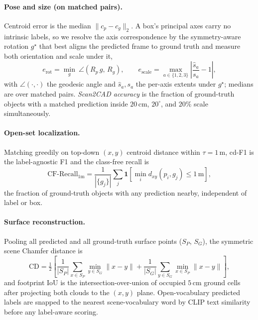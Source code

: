 \documentclass[conference]{IEEEtran}
\begin{document}
\paragraph{Pose and size (on matched pairs).}
Centroid error is the median $\lVert c_p-c_g\rVert_2$. A box's principal axes
carry no intrinsic labels, so we resolve the axis correspondence by the
symmetry-aware rotation $g^\star$ that best aligns the predicted frame to ground
truth and measure both orientation and scale under it,
\begin{equation}
  e_{\text{rot}}=\min_{g}\ \angle\!\left(R_p\,g,\,R_g\right),\qquad
  e_{\text{scale}}=\max_{a\in\{1,2,3\}}\left|\frac{\hat{s}_a}{s_a}-1\right| ,
\end{equation}
with $\angle(\cdot,\cdot)$ the geodesic angle and $\hat{s}_a,s_a$ the per-axis
extents under $g^\star$; medians are over matched pairs. \emph{Scan2CAD
accuracy} is the fraction of ground-truth objects with a matched prediction
inside $20\,\text{cm}$, $20^\circ$, and $20\%$ scale simultaneously.

\paragraph{Open-set localization.}
Matching greedily on top-down $(x,y)$ centroid distance within
$\tau=1\,\text{m}$, cd-F1 is the label-agnostic F1 and the class-free recall is
\begin{equation}
  \text{CF-Recall}_{1\text{m}}=\frac{1}{|\{g_j\}|}\sum_j
  \mathbf{1}\!\left[\min_i d_{xy}(p_i,g_j)\le 1\,\text{m}\right],
\end{equation}
the fraction of ground-truth objects with any prediction nearby, independent of
label or box.

\paragraph{Surface reconstruction.}
Pooling all predicted and all ground-truth surface points ($S_P$, $S_G$), the
symmetric scene Chamfer distance is
\begin{equation}
  \text{CD}=\tfrac{1}{2}\!\left[\frac{1}{|S_P|}\!\sum_{x\in S_P}\!\min_{y\in S_G}\!\lVert x-y\rVert
  +\frac{1}{|S_G|}\!\sum_{y\in S_G}\!\min_{x\in S_P}\!\lVert x-y\rVert\right],
\end{equation}
and footprint IoU is the intersection-over-union of occupied $5\,\text{cm}$
ground cells after projecting both clouds to the $(x,y)$ plane. Open-vocabulary
predicted labels are snapped to the nearest scene-vocabulary word by CLIP text
similarity before any label-aware scoring.
\end{document}
